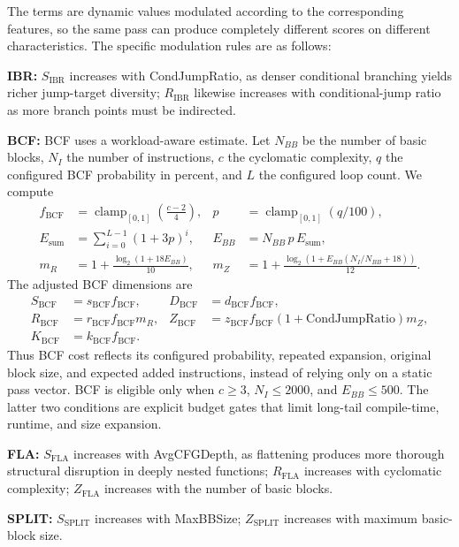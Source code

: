 \documentclass[pdflatex,sn-mathphys-num]{sn-jnl}
\theoremstyle{thmstyleone}%
\theoremstyle{thmstyletwo}%
\theoremstyle{thmstylethree}%
\begin{document}
The terms are dynamic values modulated according to the corresponding features, so the
same pass can produce completely different scores on different characteristics. The
specific modulation rules are as follows:

\textbf{IBR:} $S_{\text{IBR}}$ increases with CondJumpRatio, as denser conditional
branching yields richer jump-target diversity; $R_{\text{IBR}}$ likewise increases
with conditional-jump ratio as more branch points must be indirected.

\textbf{BCF:} BCF uses a workload-aware estimate.  Let $N_{BB}$ be the number of basic
blocks, $N_I$ the number of instructions, $c$ the cyclomatic complexity, $q$ the configured
BCF probability in percent, and $L$ the configured loop count.  We compute
\begin{align}
f_{\mathrm{BCF}} &= \operatorname{clamp}_{[0,1]}\left(\frac{c-2}{4}\right),
&p &= \operatorname{clamp}_{[0,1]}(q/100), \\
E_{\mathrm{sum}} &= \sum_{i=0}^{L-1}(1+3p)^i,
&E_{BB} &= N_{BB}\,p\,E_{\mathrm{sum}}, \label{eq:bcf_workload}\\
m_R &= 1+\frac{\log_2(1+18E_{BB})}{10},
&m_Z &= 1+\frac{\log_2(1+E_{BB}(N_I/N_{BB}+18))}{12}.
\label{eq:bcf_multipliers}
\end{align}
The adjusted BCF dimensions are
\begin{align}
S_{\mathrm{BCF}}&=s_{\mathrm{BCF}}f_{\mathrm{BCF}}, &
D_{\mathrm{BCF}}&=d_{\mathrm{BCF}}f_{\mathrm{BCF}}, \\
R_{\mathrm{BCF}}&=r_{\mathrm{BCF}}f_{\mathrm{BCF}}m_R, &
Z_{\mathrm{BCF}}&=z_{\mathrm{BCF}}f_{\mathrm{BCF}}(1+\mathrm{CondJumpRatio})m_Z, \\
K_{\mathrm{BCF}}&=k_{\mathrm{BCF}}f_{\mathrm{BCF}}. &&
\end{align}
Thus BCF cost reflects its configured probability, repeated expansion, original block
size, and expected added instructions, instead of relying only on a static pass
vector. BCF is eligible only when $c\geq3$, $N_I\leq2000$, and $E_{BB}\leq500$.  The
latter two conditions are explicit budget gates that limit long-tail compile-time,
runtime, and size expansion.

\textbf{FLA:} $S_{\text{FLA}}$ increases with AvgCFGDepth, as flattening produces
more thorough structural disruption in deeply nested functions;
$R_{\text{FLA}}$ increases with cyclomatic complexity;
$Z_{\text{FLA}}$ increases with the number of basic blocks.

\textbf{SPLIT:} $S_{\text{SPLIT}}$ increases with MaxBBSize; $Z_{\text{SPLIT}}$
increases with maximum basic-block size.
\end{document}
